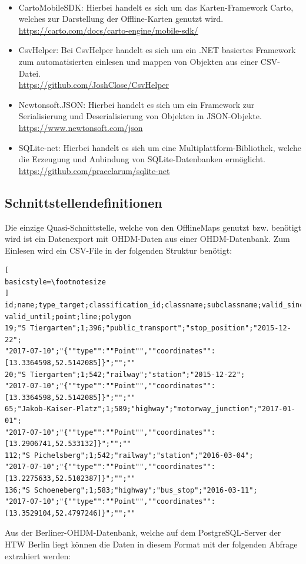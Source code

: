 \\
\begin{itemize}
	\item CartoMobileSDK: Hierbei handelt es sich um das Karten-Framework Carto, welches zur Darstellung der Offline-Karten genutzt wird.\\ \url{https://carto.com/docs/carto-engine/mobile-sdk/}
	\item CsvHelper: Bei CsvHelper handelt es sich um ein .NET basiertes Framework zum automatisierten einlesen und mappen von Objekten aus einer CSV-Datei.\\
	\url{https://github.com/JoshClose/CsvHelper}
	\item Newtonsoft.JSON: Hierbei handelt es sich um ein Framework zur Serialisierung und Deserialisierung von Objekten in JSON-Objekte.\\
	\url{https://www.newtonsoft.com/json}
	\item SQLite-net: Hierbei handelt es sich um eine Multiplattform-Bibliothek, welche die Erzeugung und Anbindung von SQLite-Datenbanken ermöglicht.\\
	\url{https://github.com/praeclarum/sqlite-net}
\end{itemize}

\subsection{Schnittstellendefinitionen}\label{ch:offlineinterfaces}
Die einzige Quasi-Schnittstelle, welche von den OfflineMaps genutzt bzw. benötigt wird ist ein Datenexport mit OHDM-Daten aus einer OHDM-Datenbank.
Zum Einlesen wird ein CSV-File in der folgenden Struktur benötigt:\\
\begin{lstlisting}[
basicstyle=\footnotesize
]
id;name;type_target;classification_id;classname;subclassname;valid_since;
valid_until;point;line;polygon
19;"S Tiergarten";1;396;"public_transport";"stop_position";"2015-12-22";
"2017-07-10";"{""type"":""Point"",""coordinates"":[13.3364598,52.5142085]}";"";""
20;"S Tiergarten";1;542;"railway";"station";"2015-12-22";
"2017-07-10";"{""type"":""Point"",""coordinates"":[13.3364598,52.5142085]}";"";""
65;"Jakob-Kaiser-Platz";1;589;"highway";"motorway_junction";"2017-01-01";
"2017-07-10";"{""type"":""Point"",""coordinates"":[13.2906741,52.533132]}";"";""
112;"S Pichelsberg";1;542;"railway";"station";"2016-03-04";
"2017-07-10";"{""type"":""Point"",""coordinates"":[13.2275633,52.5102387]}";"";""
136;"S Schoeneberg";1;583;"highway";"bus_stop";"2016-03-11";
"2017-07-10";"{""type"":""Point"",""coordinates"":[13.3529104,52.4797246]}";"";""
\end{lstlisting}
\newpage
Aus der Berliner-OHDM-Datenbank, welche auf dem PostgreSQL-Server der HTW Berlin liegt können die Daten in diesem Format mit der folgenden Abfrage extrahiert werden:


